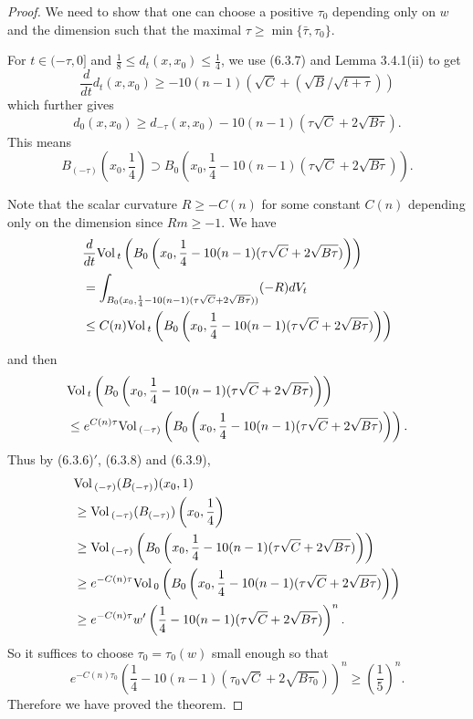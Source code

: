 \begin{proof}
We need to show that one can choose a positive $\tau_0$ depending
only on $w$ and the dimension such that the maximal $\tau \geq
\min \{\bar{\tau},\tau_0\}$.

For $t\in(-\tau,0]$ and $\frac{1}{8}\leq d_t(x,x_0)\leq
\frac{1}{4}$, we use (6.3.7) and Lemma 3.4.1(ii) to get
$$
\frac{d}{dt}d_t(x,x_0)\geq
-10(n-1)(\sqrt{C}+(\sqrt{B}/\sqrt{t+\tau}))
$$
which further gives
$$
d_0(x,x_0)\geq
d_{-\tau}(x,x_0)-10(n-1)(\tau\sqrt{C}+2\sqrt{B\tau}).
$$
This means \begin{equation} B_{(-\tau)}(x_0,\frac{1}{4})\supset
B_0\left(x_0,\frac{1}{4}-10(n-1)(\tau\sqrt{C}+2\sqrt{B\tau})\right).
\end{equation}

Note that the scalar curvature $R\geq -C(n)$ for some constant
$C(n)$ depending only on the dimension since $Rm\geq -1.$ We have
\begin{align*}
&\frac{d}{dt}{\rm Vol}\,_t\left(B_0\left(x_0,\frac{1}{4}
-10(n-1)(\tau\sqrt{C}+2\sqrt{B\tau})\right)\right)\\
&  = \int_{B_0(x_0,\frac{1}{4}-10(n-1)(\tau\sqrt{C}
+2\sqrt{B\tau}))}(-R)dV_t\\
&  \leq C(n){\rm Vol}\,_t\left(B_0\left(x_0,\frac{1}{4}
-10(n-1)(\tau\sqrt{C}+2\sqrt{B\tau})\right)\right)
\end{align*}
and then
\begin{align}
&  {\rm Vol}\,_t\left(B_0\left(x_0,\frac{1}{4}-10(n-1)(\tau\sqrt{C}
+2\sqrt{B\tau})\right)\right)\\
& \leq e^{C(n)\tau}{\rm Vol}\,_{(-\tau)}\left(B_0\left(x_0,\frac{1}{4}
-10(n-1)(\tau\sqrt{C}+2\sqrt{B\tau})\right)\right).\nonumber
\end{align}  %
Thus by (6.3.6)$'$, (6.3.8) and (6.3.9),
\begin{align*}
& {\rm Vol}\,_{(-\tau)}(B_{(-\tau)})(x_0,1) \\
&  \geq {\rm Vol}\,_{(-\tau)}(B_{(-\tau)})\left(x_0,\frac{1}{4}\right)\\
&  \geq {\rm Vol}\,_{(-\tau)}\left(B_0\left(x_0,\frac{1}{4}-10(n-1)(\tau\sqrt{C}
+2\sqrt{B\tau})\right)\right)\\
&  \geq e^{-C(n)\tau}{\rm Vol}\,_{0}\left(B_0\left(x_0,\frac{1}{4}
-10(n-1)(\tau\sqrt{C}+2\sqrt{B\tau})\right)\right)\\
& \geq e^{-C(n)\tau}w'\left(\frac{1}{4}
-10(n-1)(\tau\sqrt{C}+2\sqrt{B\tau})\right)^n.
\end{align*}
So it suffices to choose $\tau_0=\tau_0(w)$ small enough so that
$$
e^{-C(n)\tau_0}\left(\frac{1}{4}-10(n-1)(\tau_0\sqrt{C}
+2\sqrt{B\tau_0})\right)^n\geq \left(\frac{1}{5}\right)^n.
$$
Therefore we have proved the theorem.
\end{proof}



